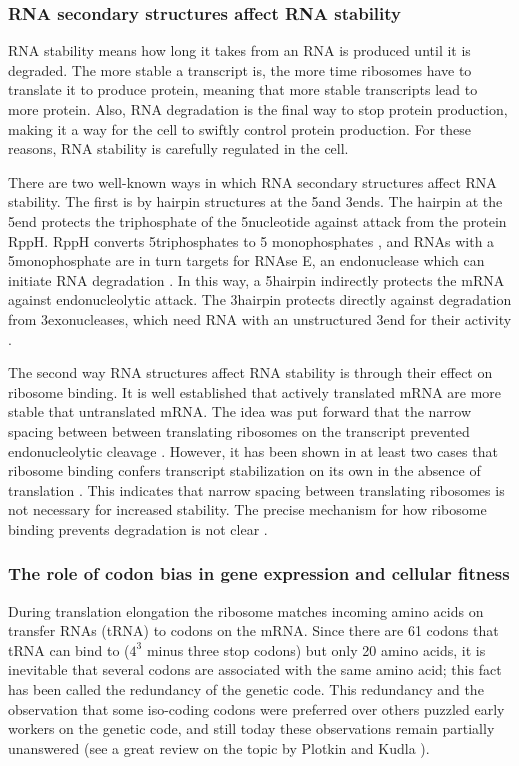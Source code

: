 \subsubsection{RNA secondary structures affect RNA stability} RNA stability
means how long it takes from an RNA is produced until it is degraded. The more
stable a transcript is, the more time ribosomes have to translate it to produce
protein, meaning that more stable transcripts lead to more protein. Also, RNA
degradation is the final way to stop protein production, making it a way for
the cell to swiftly control protein production.  For these reasons, RNA
stability is carefully regulated in the cell.

There are two well-known ways in which RNA secondary structures affect RNA
stability. The first is by hairpin structures at the 5\p and 3\p ends. The
hairpin at the 5\p end protects the triphosphate of the 5\p nucleotide against
attack from the protein RppH. RppH converts 5\p triphosphates to 5\p
monophosphates \cite{deana_bacterial_2008}, and RNAs with a 5\p monophosphate
are in turn targets for RNAse E, an endonuclease which can initiate RNA
degradation \cite{mackie_ribonuclease_1998}. In this way, a 5\p hairpin
indirectly protects the mRNA against endonucleolytic attack. The 3\p hairpin
protects directly against degradation from 3\p exonucleases, which need RNA
with an unstructured 3\p end for their activity \cite{rauhut_mrna_1999}.

The second way RNA structures affect RNA stability is through their effect on
ribosome binding. It is well established that actively translated mRNA are more
stable that untranslated mRNA. The idea was put forward that the narrow
spacing between between translating ribosomes on the transcript prevented
endonucleolytic cleavage \cite{deana_lost_2005}. However, it has been shown in
at least two cases that ribosome binding confers transcript stabilization on its own
in the absence of translation \cite{wagner_efficient_1994, hambraeus_5_2002}.
This indicates that narrow spacing between translating ribosomes is not
necessary for increased stability. The precise mechanism for how ribosome
binding prevents degradation is not clear \cite{deana_lost_2005}.

\subsubsection{The role of codon bias in gene expression and cellular fitness}
During translation elongation the ribosome matches incoming amino acids on
transfer RNAs (tRNA) to codons on the mRNA. Since there are 61 codons that tRNA
can bind to ($4^3$ minus three stop codons) but only 20 amino acids, it is
inevitable that several codons are associated with the same amino acid; this
fact has been called the redundancy of the genetic code. This redundancy and
the observation that some iso-coding codons were preferred over others puzzled
early workers on the genetic code, and still today these observations remain
partially unanswered (see a great review on the topic by Plotkin and Kudla
\cite{plotkin_synonymous_2011}).

